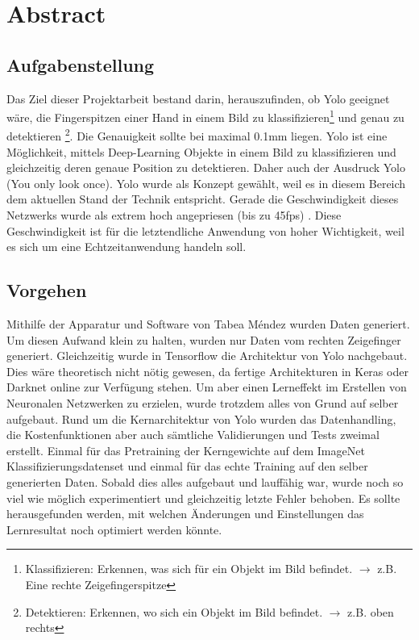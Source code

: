 \newpage
\section*{Abstract}
\subsection*{Aufgabenstellung}
Das Ziel dieser Projektarbeit bestand darin, herauszufinden, ob Yolo\cite{yolo} geeignet wäre, die Fingerspitzen einer Hand in einem Bild zu klassifizieren\footnote{\label{foot:klassifizieren}Klassifizieren: Erkennen, was sich für ein Objekt im Bild befindet. $\rightarrow$ z.B. Eine rechte Zeigefingerspitze} und genau zu detektieren \footnote{\label{detektieren} Detektieren: Erkennen, wo sich ein Objekt im Bild befindet.  $\rightarrow$ z.B. oben rechts}. 
Die Genauigkeit sollte bei maximal 0.1mm liegen.
Yolo ist eine Möglichkeit, mittels Deep-Learning Objekte in einem Bild zu klassifizieren und gleichzeitig deren genaue Position zu detektieren. 
Daher auch der Ausdruck Yolo (You only look once).
Yolo wurde als Konzept gewählt, weil es in diesem Bereich dem aktuellen Stand der Technik \cite{yolo} entspricht. 
Gerade die Geschwindigkeit dieses Netzwerks wurde als extrem hoch angepriesen (bis zu 45fps) \cite{yolo}.
Diese Geschwindigkeit ist für die letztendliche Anwendung von hoher Wichtigkeit, weil es sich um eine Echtzeitanwendung handeln soll. 

\subsection*{Vorgehen}
Mithilfe der Apparatur und Software von Tabea Méndez \cite{TabeasFingertracking} wurden Daten generiert.
Um diesen Aufwand klein zu halten, wurden nur Daten vom rechten Zeigefinger generiert. 
Gleichzeitig wurde in Tensorflow die Architektur von Yolo nachgebaut. 
Dies wäre theoretisch nicht nötig gewesen, da fertige Architekturen in Keras oder Darknet online zur Verfügung stehen.
Um aber einen Lerneffekt im Erstellen von Neuronalen Netzwerken zu erzielen, wurde trotzdem alles von Grund auf selber aufgebaut. 
Rund um die Kernarchitektur von Yolo wurden das Datenhandling, die Kostenfunktionen aber auch sämtliche Validierungen und Tests zweimal erstellt.  
Einmal für das Pretraining der Kerngewichte auf dem ImageNet Klassifizierungsdatenset und einmal für das \grqq{}echte\grqq{} Training auf den selber generierten Daten. 
Sobald dies alles aufgebaut und lauffähig war, wurde noch so viel wie möglich experimentiert und gleichzeitig letzte Fehler behoben. 
Es sollte herausgefunden werden, mit welchen Änderungen und Einstellungen das Lernresultat noch optimiert werden könnte.    

